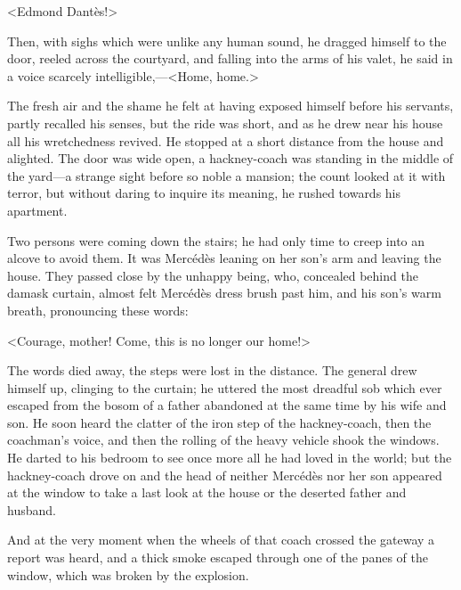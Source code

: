  <Edmond Dantès!> 

 Then, with sighs which were unlike any human sound, he dragged himself to the door, reeled across the courtyard, and falling into the arms of his valet, he said in a voice scarcely intelligible,—<Home, home.> 

 The fresh air and the shame he felt at having exposed himself before his servants, partly recalled his senses, but the ride was short, and as he drew near his house all his wretchedness revived. He stopped at a short distance from the house and alighted. The door was wide open, a hackney-coach was standing in the middle of the yard—a strange sight before so noble a mansion; the count looked at it with terror, but without daring to inquire its meaning, he rushed towards his apartment. 

 Two persons were coming down the stairs; he had only time to creep into an alcove to avoid them. It was Mercédès leaning on her son's arm and leaving the house. They passed close by the unhappy being, who, concealed behind the damask curtain, almost felt Mercédès dress brush past him, and his son's warm breath, pronouncing these words: 

 <Courage, mother! Come, this is no longer our home!> 

 The words died away, the steps were lost in the distance. The general drew himself up, clinging to the curtain; he uttered the most dreadful sob which ever escaped from the bosom of a father abandoned at the same time by his wife and son. He soon heard the clatter of the iron step of the hackney-coach, then the coachman's voice, and then the rolling of the heavy vehicle shook the windows. He darted to his bedroom to see once more all he had loved in the world; but the hackney-coach drove on and the head of neither Mercédès nor her son appeared at the window to take a last look at the house or the deserted father and husband. 

 And at the very moment when the wheels of that coach crossed the gateway a report was heard, and a thick smoke escaped through one of the panes of the window, which was broken by the explosion. 